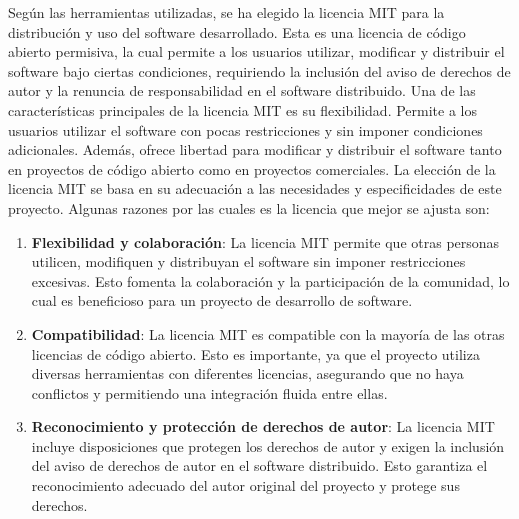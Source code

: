 Según las herramientas utilizadas, se ha elegido la licencia MIT para la distribución y uso del software desarrollado. Esta es una licencia de código abierto permisiva, la cual permite a los usuarios utilizar, modificar y distribuir el software bajo ciertas condiciones, requiriendo la inclusión del aviso de derechos de autor y la renuncia de responsabilidad en el software distribuido.
Una de las características principales de la licencia MIT es su flexibilidad. Permite a los usuarios utilizar el software con pocas restricciones y sin imponer condiciones adicionales. Además, ofrece libertad para modificar y distribuir el software tanto en proyectos de código abierto como en proyectos comerciales.
La elección de la licencia MIT se basa en su adecuación a las necesidades y especificidades de este proyecto. Algunas razones por las cuales es la licencia que mejor se ajusta son:

\begin{enumerate}
\tightlist

\item \textbf{Flexibilidad y colaboración}: La licencia MIT \cite{Open_Source_Initiative_2023} permite que otras personas utilicen, modifiquen y distribuyan el software sin imponer restricciones excesivas. Esto fomenta la colaboración y la participación de la comunidad, lo cual es beneficioso para un proyecto de desarrollo de software.
\item \textbf{Compatibilidad}: La licencia MIT es compatible con la mayoría de las otras licencias de código abierto. Esto es importante, ya que el proyecto utiliza diversas herramientas con diferentes licencias, asegurando que no haya conflictos y permitiendo una integración fluida entre ellas.
\item \textbf{Reconocimiento y protección de derechos de autor}: La licencia MIT incluye disposiciones que protegen los derechos de autor y exigen la inclusión del aviso de derechos de autor en el software distribuido. Esto garantiza el reconocimiento adecuado del autor original del proyecto y protege sus derechos.

\end{enumerate}
